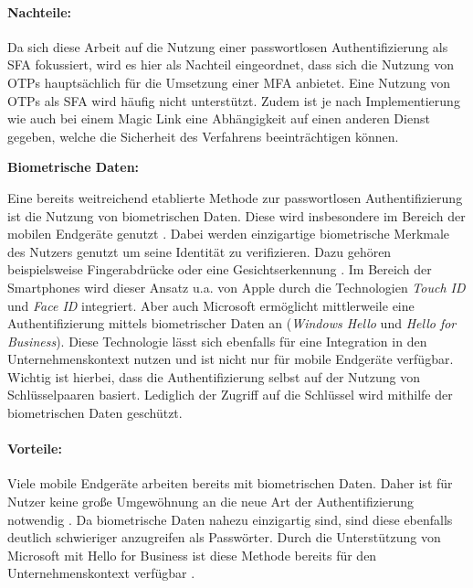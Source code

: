\paragraph*{Nachteile:} Da sich diese Arbeit auf die Nutzung einer passwortlosen Authentifizierung als \ac{SFA} fokussiert, wird es hier als Nachteil eingeordnet, dass sich die Nutzung von \ac{OTP}s hauptsächlich für die Umsetzung einer \ac{MFA} anbietet. Eine Nutzung von \ac{OTP}s als \ac{SFA} wird häufig nicht unterstützt. Zudem ist je nach Implementierung wie auch bei einem Magic Link eine Abhängigkeit auf einen anderen Dienst gegeben, welche die Sicherheit des Verfahrens beeinträchtigen können.

\textbf{Biometrische Daten:}

Eine bereits weitreichend etablierte Methode zur passwortlosen Authentifizierung ist die Nutzung von biometrischen Daten. Diese wird insbesondere im Bereich der mobilen Endgeräte genutzt \cite{parmar2022comprehensive}. Dabei werden einzigartige biometrische Merkmale des Nutzers genutzt um seine Identität zu verifizieren. Dazu gehören beispielsweise Fingerabdrücke oder eine Gesichtserkennung \cite{parmar2022comprehensive}. Im Bereich der Smartphones wird dieser Ansatz u.a. von Apple durch die Technologien \textit{Touch ID} und \textit{Face ID} integriert. Aber auch Microsoft ermöglicht mittlerweile eine Authentifizierung mittels biometrischer Daten an (\textit{Windows Hello} und \textit{Hello for Business}). Diese Technologie lässt sich ebenfalls für eine Integration in den Unternehmenskontext nutzen und ist nicht nur für mobile Endgeräte verfügbar. Wichtig ist hierbei, dass die Authentifizierung selbst auf der Nutzung von Schlüsselpaaren basiert. Lediglich der Zugriff auf die Schlüssel wird mithilfe der biometrischen Daten geschützt.

\paragraph*{Vorteile:} Viele mobile Endgeräte arbeiten bereits mit biometrischen Daten. Daher ist für Nutzer keine große Umgewöhnung an die neue Art der Authentifizierung notwendig \cite{parmar2022comprehensive}. Da biometrische Daten nahezu einzigartig sind, sind diese ebenfalls deutlich schwieriger anzugreifen als Passwörter. Durch die Unterstützung von Microsoft mit Hello for Business ist diese Methode bereits für den Unternehmenskontext verfügbar \cite{parmar2022comprehensive}.

